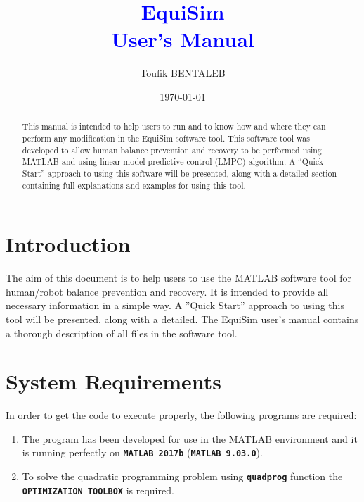 \documentclass[12pt,oneside,notitlepage,abstracton,a4paper]{scrartcl}
\title{\Huge  \textcolor{blue}{EquiSim\\User's Manual}}
\author{\normalsize Toufik BENTALEB}
\date{\normalsize \today}
\begin{document}
\maketitle

\vspace{5em}
\begin{abstract}
\noindent
This manual is intended to help users to run and to know how and where they can perform any modification in the EquiSim software tool. This software tool was developed to allow human balance prevention and recovery to be performed using MATLAB and using linear model predictive control (LMPC) algorithm. A “Quick Start” approach to using this software will be presented, along with a detailed section containing full explanations and examples for using this tool.
\end{abstract}
  
\newpage
\tableofcontents
\newpage 

\section{Introduction}
\label{intro}
The aim of this document is to help users to use the MATLAB software tool for human/robot balance prevention and recovery. It is intended to provide all necessary information in a simple way. A ''Quick Start'' approach to using this tool will be presented, along with a detailed. The EquiSim user's manual contains a thorough description of all files in the software tool.

   
\section{System Requirements} \label{System}
In order to get the code to execute properly, the following programs are required:
\begin{enumerate}
  \item The program has been developed for use in the MATLAB environment and it is running perfectly on \textbf{\texttt{MATLAB 2017b}} (\textbf{\texttt{MATLAB 9.03.0}}).    
  \item To solve the quadratic programming problem using \textbf{\texttt{quadprog}} function the \textbf{\texttt{OPTIMIZATION TOOLBOX}} is required.
\end{enumerate}
\end{document}
